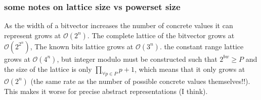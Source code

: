 \documentclass[12pt]{article}
\begin{document}
\subsubsection{some notes on lattice size vs powerset size}
As the width of a bitvector increases the number of concrete values it can represent grows at $\mathcal{O}(2^n)$.
The complete lattice of the bitvector grows at $\mathcal{O}(2^{2^n})$,
The known bits lattice grows at $\mathcal{O}(3^n)$.
the constant range lattice grows at $\mathcal{O}(4^n)$,
but integer modulo must be constructed such that $2^{bw} \geq P$
and the size of the lattice is only $\prod_{\forall p \in P} p+1$,
which means that it only grows at $\mathcal{O}(2^n)$ (the same rate as the number of possible concrete values themselves!!).
This makes it worse for precise abstract representations (I think).
\end{document}
